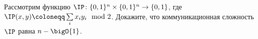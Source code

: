 Рассмотрим функцию $\IP\colon \{0, 1\}^n \times \{0, 1\}^n \to \{0, 1\}$, где $\IP(x, y) \coloneqq
\sum\limits_{i} x_{i}y_{i} \mod 2$. Докажите, что коммуникационная сложность $\IP$ равна $n - \bigO{1}$.
